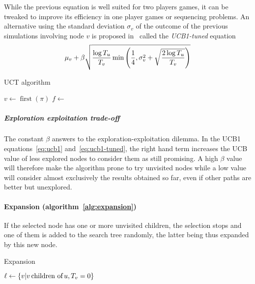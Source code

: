 \documentclass[oneside,twocolumn]{article}
\DeclareMathOperator{\argmax}{argmax}
\DeclareMathOperator{\first}{first}
\begin{document}
While the previous equation is well suited for two players games, it can be
tweaked to improve its efficiency in one player games or sequencing problems. An
alternative using the standard deviation \(\sigma_v\) of the outcome of the
previous simulations involving node \(v\) is
proposed in~\cite{sebag2010fuse} called the \emph{UCB1-tuned} equation
\begin{equation}\label{eq:ucb1-tuned}
  \mu_v +
  \beta\sqrt{%
    \frac{\log T_u}{T_v}
    \min\left( \frac{1}{4}, \sigma^2_v +
    \sqrt{%
      \frac{2 \log T_u}{T_v}
    }\right)
  }
\end{equation}
\begin{algorithm}
  \caption{UCT algorithm}\label{alg:tree_pol}
  \begin{algorithmic}
    \State{}\(v \gets \first(\pi)\)
    \State{}\Return{$\pi$}
    \Else{}
    \State{}
    \Else{}
    \State{}$f \gets$ 
    \State{}
    \EndIf{}
    \EndIf{}
    \EndFunction{}
  \end{algorithmic}
  \begin{algorithmic}
    \State{}\Return{$\argmax\{\Call{UCB}{v'} | v' \text{\,children of\,} v \}$}
    \EndFunction{}
  \end{algorithmic}
\end{algorithm}

\subparagraph{Exploration exploitation trade-off} The constant \(\beta\) answers
to the exploration-exploitation dilemma. In the UCB1 equations~\ref{eq:ucb1}
and~\ref{eq:ucb1-tuned},
the right hand term increases the UCB value of less explored nodes to consider them
as still promising. A high \(\beta\) value will therefore make the algorithm
prone to try unvisited nodes while a low value will consider almost exclusively
the results obtained so far, even if other paths are better but unexplored.

\paragraph{Expansion (algorithm~\ref{alg:expansion})}
If the selected node has one or more unvisited children, the selection stops and
one of them is added to the search tree randomly, the latter being thus expanded
by this new node.
\begin{algorithm}
  \caption{Expansion}\label{alg:expansion}
  \begin{algorithmic}
    \State{}$\ell \gets \{ v | v \text{\,children of\,} u, T_v = 0 \}$
    \State{}
    \EndFunction{}
  \end{algorithmic}
\end{algorithm}
\end{document}
